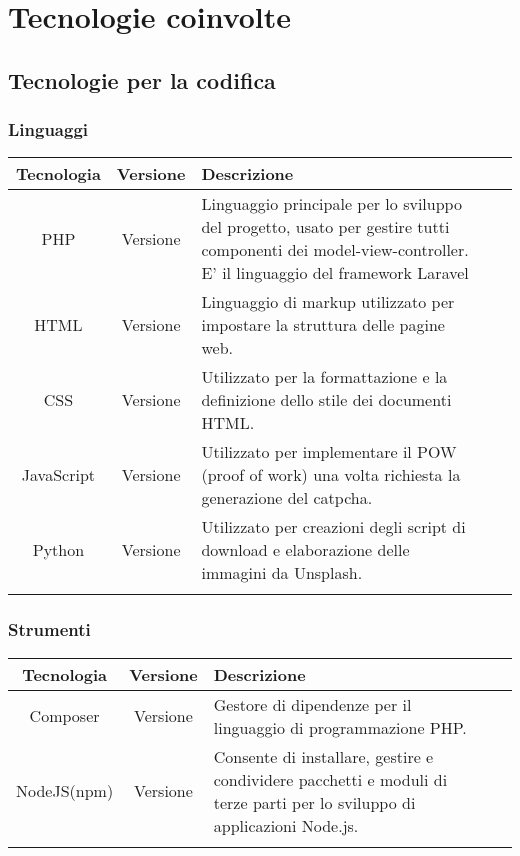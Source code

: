\section{Tecnologie coinvolte}

\subsection{Tecnologie per la codifica}

\subsubsection{Linguaggi}

\begin{center}
\setlength\extrarowheight{5pt}
\renewcommand\tabularxcolumn[1]{>{\Centering}m{#1}}
\begin{tabularx}{\textwidth}{| c | c | X | X | X |} 
	\hline
	\rowcolor{white}
	\textbf{Tecnologia} & \textbf{Versione} & \textbf{Descrizione}\\
	\hline
	PHP & Versione & Linguaggio principale per lo sviluppo del progetto, usato per gestire tutti componenti dei model-view-controller. E' il linguaggio del framework Laravel\\
	\hline
	HTML & Versione & Linguaggio di markup utilizzato per impostare la struttura delle pagine web.\\
	\hline
	CSS & Versione & Utilizzato per la formattazione e la definizione dello stile dei documenti HTML.\\
	\hline
	JavaScript & Versione & Utilizzato per implementare il POW (proof of work) una volta richiesta la generazione del catpcha.\\
	\hline
	Python & Versione & Utilizzato per creazioni degli script di download e elaborazione delle immagini da Unsplash.\\
	\hline
	\rowcolor{white}
	\caption{Linguaggi utilizzati}
	\end{tabularx}
\end{center}

\subsubsection{Strumenti}

\begin{center}
\setlength\extrarowheight{5pt}
\renewcommand\tabularxcolumn[1]{>{\Centering}m{#1}}
\begin{tabularx}{\textwidth}{| c | c | X | X | X |} 
	\hline
	\rowcolor{white}
	\textbf{Tecnologia} & \textbf{Versione} & \textbf{Descrizione}\\
	\hline
	Composer & Versione &  Gestore di dipendenze per il linguaggio di programmazione PHP.\\
	\hline
	NodeJS(npm) & Versione & Consente di installare, gestire e condividere pacchetti e moduli di terze parti per lo sviluppo di applicazioni Node.js.\\
	\hline
	\rowcolor{white}
	\caption{Strumenti utilizzati}
	\end{tabularx}
\end{center}

